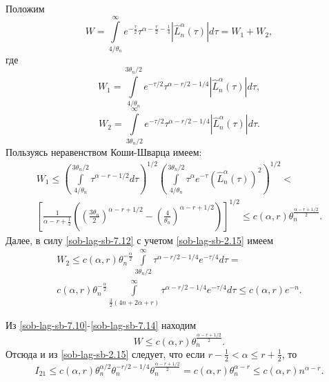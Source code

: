 Положим
\begin{equation}
  W =\int\limits_{4/\theta_n}^{\infty} e^{-\frac{\tau}{2}}\tau^{\alpha - \frac{r}{2} -\frac{1}{4}} |\hat{L}_n^\alpha(\tau)|d\tau= W_1 + W_2, \label{sob-lag-sb-7.10}
\end{equation}
где
\begin{equation}
  W_1 = \int\limits_{4/\theta_n}^{3\theta_n/2} e^{-\tau/2}\tau^{\alpha - r/2 - 1/4}|\hat{L}_n^\alpha(\tau)|d\tau,
  \label{sob-lag-sb-7.11}
\end{equation}
\begin{equation}
  W_2 = \int\limits_{3\theta_n/2}^{\infty} e^{-\tau/2}\tau^{\alpha - r/2 - 1/4} |\hat{L}_n^\alpha(\tau)|d\tau.
  \label{sob-lag-sb-7.12}
\end{equation}
Пользуясь неравенством Коши-Шварца имеем:
\begin{multline}
  W_1 \leq
  \left(
  \int\limits_{4/\theta_n}^{3\theta_n/2} \tau^{\alpha-r-1/2}d\tau
  \right)^{1/2}
  \left(
  \int\limits_{4/\theta_n}^{3\theta_n/2} \tau^\alpha e^{-\tau}(\hat{L}_n^{\alpha}(\tau))^2
  \right)^{1/2}
  < \\
  \left[
  \frac{1}{\alpha-r+\frac12}\left(\left(\frac{3\theta_n}{2}\right)^{\alpha-r+1/2} - \left(\frac{4}{\theta_n}\right)^{\alpha-r+1/2}\right)
  \right]^{1/2}
  \leq
  c(\alpha,r)\theta_n^{\frac{\alpha-r+1/2}{2}}.
  \label{sob-lag-sb-7.13}
\end{multline}
Далее, в силу \eqref{sob-lag-sb-7.12} с учетом \eqref{sob-lag-sb-2.15} имеем
\begin{multline}
  W_2 \leq c(\alpha,r)\theta_n^{-\frac\alpha2}
  \int\limits_{3\theta_n/2}^{\infty}\tau^{\alpha-r/2-1/4}e^{-\tau/4}d\tau = \\
  c(\alpha, r)\theta_n^{-\frac\alpha2}\int\limits_{\frac32(4n+2\alpha+r)}^{\infty} \tau^{\alpha-r/2-1/4}e^{-\tau/4}d\tau
  \leq   c(\alpha,r)e^{-n}.
  \label{sob-lag-sb-7.14}
\end{multline}

Из \eqref{sob-lag-sb-7.10}-\eqref{sob-lag-sb-7.14} находим
\begin{equation*}
  W \leq c(\alpha,r)\theta_n^{\frac{\alpha - r + 1/2}{2}}.
\end{equation*}
Отсюда и из \eqref{sob-lag-sb-2.15}   следует, что если $r - \frac12 < \alpha \leq r + \frac12$, то
\begin{equation}
  I_{21} \leq c(\alpha,r)\theta_n^{\alpha/2}\theta_n^{-r/2-1/4}\theta_n^{\frac{\alpha-r+1/2}{2}}=
  c(\alpha,r)\theta_n^{\alpha-r} \leq c(\alpha,r)n^{\alpha - r}.
  \label{sob-lag-sb-7.15}
\end{equation}

